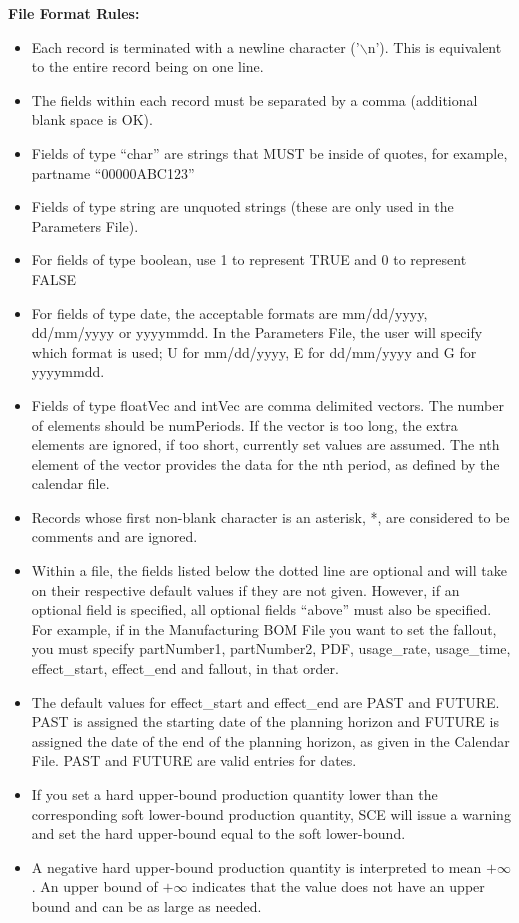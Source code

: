 \noindent
{\bf File Format Rules:}
\begin{itemize}
\item Each record is terminated with a newline character ('$\backslash$n').  This is
  equivalent to the entire record being on one line.
\item The fields within each record must be separated by a comma (additional
  blank space is OK).
\item Fields of type ``char'' are strings that MUST be inside of quotes, for example,
  partname ``00000ABC123''
\item Fields of type string are unquoted strings (these are only used
  in the Parameters File).
\item For fields of type boolean, use 1 to represent TRUE and 0 to
  represent FALSE
\item For fields of type date, the acceptable formats are mm/dd/yyyy, 
  dd/mm/yyyy or yyyymmdd.  In the Parameters File, the user will specify which
  format is used;  U for mm/dd/yyyy, E for dd/mm/yyyy and G for yyyymmdd.
\item Fields of type floatVec and intVec are comma delimited vectors.
  The number of elements should be numPeriods.  If the vector is too
  long, the extra elements are ignored, if too short,  currently set
  values are assumed.  The nth element of the vector provides the
  data for the nth period, as defined by the calendar file.
\item Records whose first non-blank character is an asterisk, *, are 
  considered to be comments and are ignored.
\item Within a file, the fields listed below the dotted line are optional and
 will take on their respective default values if they are not given.  However,
 if an optional field is specified, all optional fields ``above'' must also be
 specified.  For example, if in the Manufacturing BOM File you want to set the
 fallout, you must specify partNumber1, partNumber2, PDF, usage\_rate, 
 usage\_time, effect\_start, effect\_end and fallout, in that order.
\item The default values for effect\_start and effect\_end are PAST and FUTURE.
PAST is assigned the starting date of the planning horizon
and FUTURE is assigned the date of the end of the 
planning horizon, as given in the Calendar File.  PAST and FUTURE are valid entries
for dates.
\item If you set a hard upper-bound production quantity lower than 
the corresponding soft lower-bound production quantity, SCE will issue
a warning and set the hard upper-bound equal to the soft lower-bound.
\item A negative hard upper-bound production quantity is interpreted to
mean $+\infty$.  An upper bound of $+\infty$ indicates that the value
does not have an upper bound and can be as large as needed.
\end{itemize}

